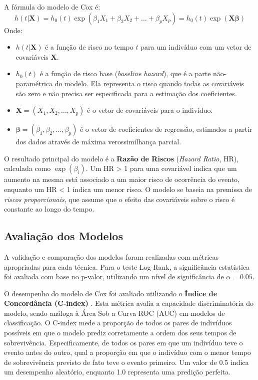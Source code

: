 A fórmula do modelo de Cox é:
\begin{equation}
h(t | \mathbf{X}) = h_0(t) \exp(\beta_1 X_1 + \beta_2 X_2 + \dots + \beta_p X_p) = h_0(t) \exp(\mathbf{X}\boldsymbol{\beta})
\end{equation}
Onde:
\begin{itemize}
    \item $h(t | \mathbf{X})$ é a função de risco no tempo $t$ para um indivíduo com um vetor de covariáveis $\mathbf{X}$.
    \item $h_0(t)$ é a função de risco base (\textit{baseline hazard}), que é a parte não-paramétrica do modelo. Ela representa o risco quando todas as covariáveis são zero e não precisa ser especificada para a estimação dos coeficientes.
    \item $\mathbf{X} = (X_1, X_2, \dots, X_p)$ é o vetor de covariáveis para o indivíduo.
    \item $\boldsymbol{\beta} = (\beta_1, \beta_2, \dots, \beta_p)$ é o vetor de coeficientes de regressão, estimados a partir dos dados através de máxima verossimilhança parcial.
\end{itemize}
O resultado principal do modelo é a \textbf{Razão de Riscos} (\textit{Hazard Ratio}, HR), calculada como $\exp(\beta_i)$. Um HR > 1 para uma covariável indica que um aumento na mesma está associado a um maior risco de ocorrência do evento, enquanto um HR < 1 indica um menor risco. O modelo se baseia na premissa de \textit{riscos proporcionais}, que assume que o efeito das covariáveis sobre o risco é constante ao longo do tempo.

\subsection{Avaliação dos Modelos}
A validação e comparação dos modelos foram realizadas com métricas apropriadas para cada técnica. Para o teste Log-Rank, a significância estatística foi avaliada com base no p-valor, utilizando um nível de significância de $\alpha = 0.05$.

O desempenho do modelo de Cox foi avaliado utilizando o \textbf{Índice de Concordância (C-index)} \cite{harrell_1982}. Esta métrica avalia a capacidade discriminatória do modelo, sendo análoga à Área Sob a Curva ROC (AUC) em modelos de classificação. O C-index mede a proporção de todos os pares de indivíduos possíveis em que o modelo prediz corretamente a ordem dos seus tempos de sobrevivência. Especificamente, de todos os pares em que um indivíduo teve o evento antes do outro, qual a proporção em que o indivíduo com o menor tempo de sobrevivência previsto de fato teve o evento primeiro. Um valor de 0.5 indica um desempenho aleatório, enquanto 1.0 representa uma predição perfeita.
